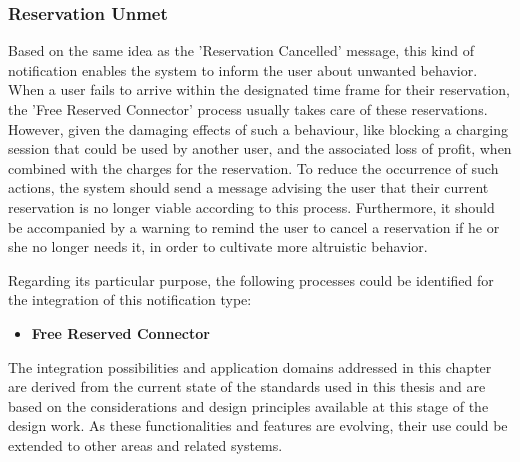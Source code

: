 \subsubsection{Reservation Unmet}
\label{ch:Design:sec:Reservation System:ssec:Notification Capabilities:sssec:Reservation Unmet}

Based on the same idea as the 'Reservation Cancelled' message, this kind of notification enables the system to inform the user about unwanted behavior.
When a user fails to arrive within the designated time frame for their reservation, the 'Free Reserved Connector' process usually  takes care of these reservations. 
However, given the damaging effects of such a behaviour, like blocking a charging session that could be used by another user, and the associated loss of profit, when combined with the charges for the reservation.
To reduce the occurrence of such actions, the system should send a message advising the user that their current reservation is no longer viable according to this process. Furthermore, it should be accompanied by a warning to remind the user to cancel a reservation if he or she no longer needs it, in order to cultivate more altruistic behavior.

\noindent Regarding its particular purpose, the following processes could be identified for the integration of this notification type:
\begin{itemize}
    \item \textbf{Free Reserved Connector}
\end{itemize}

\noindent The integration possibilities and application domains addressed in this chapter are derived from the current state of the standards used in this thesis and are based on the considerations and design principles available at this stage of the design work. 
As these functionalities and features are evolving, their use could be extended to other areas and related systems.
